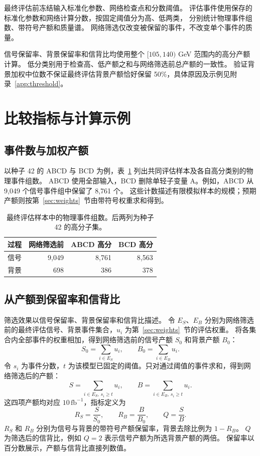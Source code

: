\documentclass[11pt,a4paper,fontset=fandol,scheme=plain]{ctexart}
\begin{document}
最终评估前冻结输入标准化参数、网络检查点和分数阈值。
评估事件使用保存的标准化参数和网络计算分数，按固定阈值分为高、低两类，
分别统计物理事件组数、带符号产额和质量谱。
网络筛选仅改变被保留的事件，不改变单个事件的质量。

信号保留率、背景保留率和信背比均使用整个 $[105,140)$ GeV 范围内的高分产额计算。
低分类别用于检查高、低产额之和与网络筛选前总产额的一致性。
验证背景加权中位数不保证最终评估背景产额恰好保留 50\%，具体原因及示例见附录~\ref{app:threshold}。

\section{比较指标与计算示例}\label{sec:basic}

\subsection{事件数与加权产额}
以种子 42 的 ABCD 与 BCD 为例，表~\ref{tab:groups} 列出共同评估样本及各自高分类别的物理事件组数。
ABCD 使用全部输入，BCD 删除单轻子变量 A。例如，ABCD 从 9,049 个信号事件组中保留了 8,761 个。
这些计数描述有限模拟样本的规模；预期产额则按第~\ref{sec:weights}~节由带符号权重求和得到。
\begin{table}[H]
\caption{最终评估样本中的物理事件组数。后两列为种子 42 的高分子集。}
\label{tab:groups}
\centering
\begin{tabular}{lrrr}
\toprule
过程 & 网络筛选前 & ABCD 高分 & BCD 高分 \\
\midrule
信号 & 9,049 & 8,761 & 8,563 \\
背景 & 698 & 386 & 378 \\
\bottomrule
\end{tabular}
\end{table}

\subsection{从产额到保留率和信背比}
筛选效果以信号保留率、背景保留率和信背比描述。
令 $E_S$、$E_B$ 分别为网络筛选前的最终评估信号、背景事件集合，$u_i$ 为第~\ref{sec:weights}~节的评估权重。
将各集合内全部事件的权重相加，得到网络筛选前的信号产额 $S_0$ 和背景产额 $B_0$：
\[
 S_0=\sum_{i\in E_S}u_i,\qquad
 B_0=\sum_{i\in E_B}u_i.
\]
令 $s_i$ 为事件分数，$t$ 为该模型已固定的阈值。只对通过阈值的事件求和，得到网络筛选后的产额：
\[
 S=\sum_{i\in E_S,\,s_i\geq t}u_i,\qquad
 B=\sum_{i\in E_B,\,s_i\geq t}u_i.
\]
这四项产额均对应 $10\,\mathrm{fb}^{-1}$，指标定义为
\[
 R_S=\frac{S}{S_0},\qquad R_B=\frac{B}{B_0},\qquad Q=\frac{S}{B}.
\]
$R_S$ 和 $R_B$ 分别为信号与背景的带符号产额保留率，背景去除比例为 $1-R_B$。
$Q$ 为筛选后的信背比，例如 $Q=2$ 表示信号产额为所选背景产额的两倍。
保留率以百分数展示，产额与信背比直接列数值。
\end{document}
